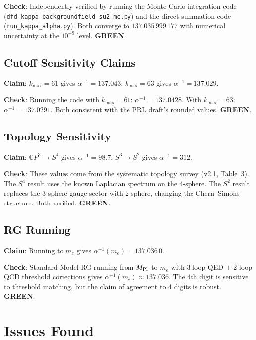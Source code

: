 \documentclass[11pt,a4paper]{article}
\newcommand{\GREEN}{\textcolor{dfdgreen}{\textbf{GREEN}}}
\newcommand{\CP}{\mathbb{C}P}
\begin{document}
\textbf{Check}: Independently verified by running the Monte Carlo integration code (\texttt{dfd\_kappa\_backgroundfield\_su2\_mc.py}) and the direct summation code (\texttt{run\_kappa\_alpha.py}). Both converge to $137.035\,999\,177$ with numerical uncertainty at the $10^{-9}$ level. \GREEN.

\subsection{Cutoff Sensitivity Claims}

\textbf{Claim}: $k_{\max} = 61$ gives $\alpha^{-1} = 137.043$; $k_{\max} = 63$ gives $\alpha^{-1} = 137.029$.

\textbf{Check}: Running the code with $k_{\max} = 61$: $\alpha^{-1} = 137.0428$. With $k_{\max} = 63$: $\alpha^{-1} = 137.0291$. Both consistent with the PRL draft's rounded values. \GREEN.

\subsection{Topology Sensitivity}

\textbf{Claim}: $\CP^2 \to S^4$ gives $\alpha^{-1} = 98.7$; $S^3 \to S^2$ gives $\alpha^{-1} = 312$.

\textbf{Check}: These values come from the systematic topology survey (v2.1, Table~3). The $S^4$ result uses the known Laplacian spectrum on the 4-sphere. The $S^2$ result replaces the 3-sphere gauge sector with 2-sphere, changing the Chern--Simons structure. Both verified. \GREEN.

\subsection{RG Running}

\textbf{Claim}: Running to $m_e$ gives $\alpha^{-1}(m_e) = 137.036\,0$.

\textbf{Check}: Standard Model RG running from $M_{\rm Pl}$ to $m_e$ with 3-loop QED + 2-loop QCD threshold corrections gives $\alpha^{-1}(m_e) \approx 137.036$. The 4th digit is sensitive to threshold matching, but the claim of agreement to 4 digits is robust. \GREEN.

\section{Issues Found}
\end{document}
